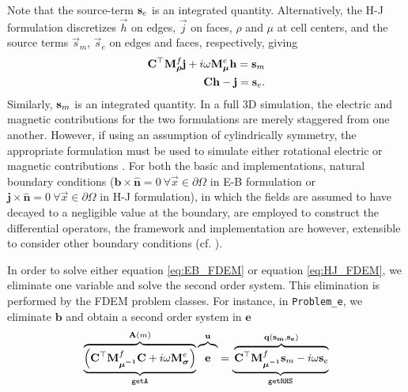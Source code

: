 Note that
the source-term $\mathbf{s}_e$ is an integrated quantity. Alternatively, the H-J
formulation discretizes $\vec{h}$ on edges, $\vec{j}$ on faces, $\rho$ and
$\mu$ at cell centers, and the source terms $\vec{s}_m$, $\vec{s}_e$ on edges
and faces, respectively, giving
\begin{equation}
    \begin{split}
        {\mathbf C}^\top {{\mathbf M}^f_{\boldsymbol{\rho}}} \mathbf{j} + i\omega{{\mathbf M}^e_{\boldsymbol{\mu}}}\mathbf{h} = \mathbf{s}_m \\
        {\mathbf C} \mathbf{h} - \mathbf{j} = \mathbf{s}_e.
    \end{split}
    \label{eq:HJ_FDEM}
\end{equation}
Similarly, $\mathbf{s}_m$ is an integrated quantity. In a full 3D simulation, the
electric and magnetic contributions for the two formulations are merely
staggered from one another. However, if using an assumption of cylindrically
symmetry, the appropriate formulation must be used to simulate either
rotational electric or magnetic contributions \citep{Heagy2015}. For both the
basic \FDEM and \TDEM implementations, natural boundary conditions ($\mathbf{b}
\times \hat{\mathbf{n}} = 0 ~ \forall \vec{x} \in \partial \Omega$ in E-B
formulation or $\mathbf{j} \times \hat{\mathbf{n}} = 0 ~ \forall \vec{x}
\in \partial \Omega$ in H-J formulation), in which the fields are assumed to
have decayed to a negligible value at the boundary, are employed to construct
the differential operators, the framework and implementation are however,
extensible to consider other boundary conditions (cf. \cite{Haber2014a,
Rivera-rios2014}).

In order to solve either equation \ref{eq:EB_FDEM} or equation \ref{eq:HJ_FDEM}, we eliminate
one variable and solve the second order system. This elimination is performed
by the FDEM problem classes. For instance, in \FDEM \texttt{Problem\_e}, we
eliminate $\mathbf{b}$ and obtain a second order system in $\mathbf{e}$
\begin{equation}
\underbrace{
\overbrace{
\left(\dcurl^\top \MfMui \dcurl + i\omega\MeSigma\right)
}^{\mathbf{A}(m)}}_{\texttt{getA}}
\overbrace{\vphantom{\left(\MfMui\right)}
            \mathbf{e}}^{\mathbf{u}}
=
\underbrace{ \vphantom{\left(\MfMui\right)}
\overbrace{
\dcurl^\top \MfMui \sm - i \omega \se
}^{\mathbf{q(s_m, s_e)}}
}_{\texttt{getRHS}}
\label{eq:problem_e}
\end{equation}

